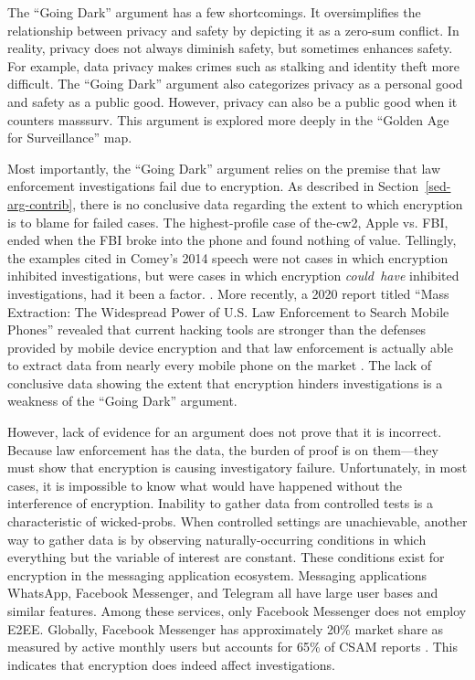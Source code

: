 \documentclass[conference]{IEEEtran}
\def\ii#1{\mbox{\textit{#1}}}
\newcommand{\mysec}[1]{Section~\ref{#1}}
\begin{document}
The ``Going Dark'' argument has a few shortcomings. It oversimplifies the relationship between privacy and safety by
depicting it as a zero-sum conflict. In reality, privacy does not always diminish safety, but sometimes enhances safety.
For example, data privacy makes crimes such as stalking and identity theft more difficult. The ``Going Dark'' argument
also categorizes privacy as a personal good and safety as a public good. However, privacy can also be a public good when
it counters \ac{masssurv}. This argument is explored more deeply in the ``Golden Age for Surveillance'' map.

Most importantly, the ``Going Dark'' argument relies on the premise that law enforcement investigations fail due to
encryption. As described in \mysec{sed-arg-contrib}, there is no conclusive data regarding the extent to which
encryption is to blame for failed cases. The highest-profile case of \ac{the-cw2}, Apple vs. FBI, ended when the
\ac{FBI} broke into the phone and found nothing of value. Tellingly, the examples cited in Comey's 2014 speech were not
cases in which encryption inhibited investigations, but were cases in which encryption \ii{could have} inhibited
investigations, had it been a factor. \cite{comey_2014}. More recently, a 2020 report titled ``Mass Extraction: The
Widespread Power of U.S. Law Enforcement to Search Mobile Phones'' revealed that current hacking tools are stronger than
the defenses provided by mobile device encryption and that law enforcement is actually able to extract data from nearly
every mobile phone on the market \cite{koepke_2020}. The lack of conclusive data showing the extent that encryption
hinders investigations is a weakness of the ``Going Dark'' argument.

However, lack of evidence for an argument does not prove that it is incorrect. Because law enforcement has the data, the
burden of proof is on them---they must show that encryption is causing investigatory failure. Unfortunately, in most
cases, it is impossible to know what would have happened without the interference of encryption. Inability to gather
data from controlled tests is a characteristic of \acp{wicked-prob}. When controlled settings are unachievable, another
way to gather data is by observing naturally-occurring conditions in which everything but the variable of interest are
constant. These conditions exist for encryption in the messaging application ecosystem. Messaging applications WhatsApp,
Facebook Messenger, and Telegram all have large user bases and similar features. Among these services, only Facebook
Messenger does not employ \ac{E2EE}. Globally, Facebook Messenger has approximately 20\% market share as measured by
active monthly users \cite{statista_2020} but accounts for 65\% of \ac{CSAM} reports \cite{keller_internet_2019}. This
indicates that encryption does indeed affect investigations.
\end{document}
